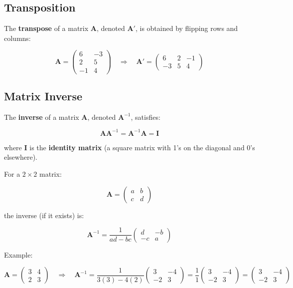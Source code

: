 \documentclass[
  letterpaper,
  DIV=11,
  numbers=noendperiod]{scrreprt}
\begin{document}
\subsection{Transposition}\label{transposition}

The \textbf{transpose} of a matrix \(\mathbf{A}\), denoted
\(\mathbf{A}'\), is obtained by flipping rows and columns:

\[
\mathbf{A} = \begin{pmatrix} 6 & -3 \\ 2 & 5 \\ -1 & 4 \end{pmatrix} \quad \Rightarrow \quad \mathbf{A}' = \begin{pmatrix} 6 & 2 & -1 \\ -3 & 5 & 4 \end{pmatrix}
\]

\subsection{Matrix Inverse}\label{matrix-inverse}

The \textbf{inverse} of a matrix \(\mathbf{A}\), denoted
\(\mathbf{A}^{-1}\), satisfies:

\[
\mathbf{A} \mathbf{A}^{-1} = \mathbf{A}^{-1} \mathbf{A} = \mathbf{I}
\]

where \(\mathbf{I}\) is the \textbf{identity matrix} (a square matrix
with 1's on the diagonal and 0's elsewhere).

For a \(2 \times 2\) matrix:

\[
\mathbf{A} = \begin{pmatrix} a & b \\ c & d \end{pmatrix}
\]

the inverse (if it exists) is:

\[
\mathbf{A}^{-1} = \frac{1}{ad - bc} \begin{pmatrix} d & -b \\ -c & a \end{pmatrix}
\]

Example:

\[
\mathbf{A} = \begin{pmatrix} 3 & 4 \\ 2 & 3 \end{pmatrix} \quad \Rightarrow \quad \mathbf{A}^{-1} = \frac{1}{3(3) - 4(2)} \begin{pmatrix} 3 & -4 \\ -2 & 3 \end{pmatrix} = \frac{1}{1} \begin{pmatrix} 3 & -4 \\ -2 & 3 \end{pmatrix} = \begin{pmatrix} 3 & -4 \\ -2 & 3 \end{pmatrix}
\]
\end{document}
